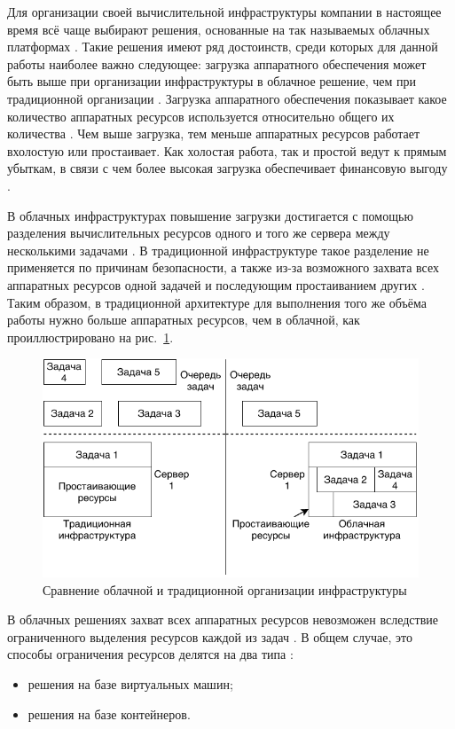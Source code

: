 Для организации своей вычислительной инфраструктуры компании в настоящее время всё чаще выбирают решения, основанные на так называемых облачных платформах  \cite{fake-16}.
Такие решения имеют ряд достоинств, среди которых для данной работы наиболее важно следующее: загрузка аппаратного обеспечения может быть выше при организации инфраструктуры в облачное решение, чем при традиционной организации \cite{cloud-computing-concepts}.
Загрузка аппаратного обеспечения показывает какое количество аппаратных ресурсов используется относительно общего их количества \cite{fake-17}.
Чем выше загрузка, тем меньше аппаратных ресурсов работает вхолостую или простаивает.
Как холостая работа, так и простой ведут к прямым убыткам, в связи с чем более высокая загрузка обеспечивает финансовую выгоду \cite{fake-19}.

В облачных инфраструктурах повышение загрузки достигается с помощью разделения вычислительных ресурсов одного и того же сервера между несколькими задачами \cite{fake-20}.
В традиционной инфраструктуре такое разделение не применяется по причинам безопасности, а также из-за возможного захвата всех аппаратных ресурсов одной задачей и последующим простаиванием других \cite{fake-22}.
Таким образом, в традиционной архитектуре для выполнения того же объёма работы нужно больше аппаратных ресурсов, чем в облачной, как проиллюстрировано на рис.~\ref{load-utilization}.

\begin{figure}[hbtp]
    \centering
    \caption{Сравнение облачной и традиционной организации инфраструктуры}
    \label{load-utilization}
    \includegraphics[width=13cm]{img/load-utilization.pdf}
\end{figure}

В облачных решениях захват всех аппаратных ресурсов невозможен вследствие ограниченного выделения ресурсов каждой из задач \cite{fake-23}.
В общем случае, это способы ограничения ресурсов делятся на два типа \cite{containers-and-vm-big-data}:
\begin{itemize}
    \item решения на базе виртуальных машин;
    \item решения на базе контейнеров.
\end{itemize}

